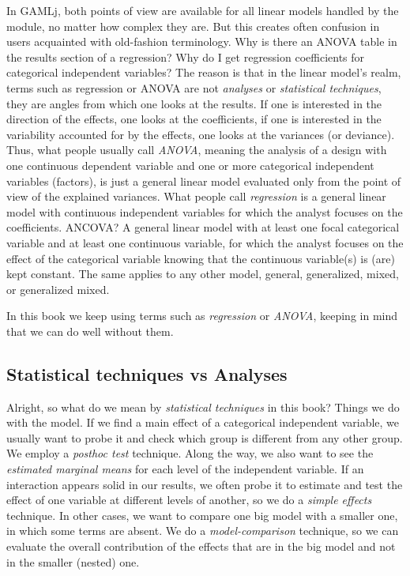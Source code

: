 \documentclass[
]{book}
\begin{document}
In {GAMLj}, both points of view are available for all linear models handled by the module, no matter how complex they are. But this creates often confusion in users acquainted with old-fashion terminology. Why is there an ANOVA table in the results section of a regression? Why do I get regression coefficients for categorical independent variables? The reason is that in the linear model's realm, terms such as regression or ANOVA are not \emph{analyses} or \emph{statistical techniques}, they are angles from which one looks at the results. If one is interested in the direction of the effects, one looks at the coefficients, if one is interested in the variability accounted for by the effects, one looks at the variances (or deviance). Thus, what people usually call \emph{ANOVA}, meaning the analysis of a design with one continuous dependent variable and one or more categorical independent variables (factors), is just a general linear model evaluated only from the point of view of the explained variances. What people call \emph{regression} is a general linear model with continuous independent variables for which the analyst focuses on the coefficients. ANCOVA? A general linear model with at least one focal categorical variable and at least one continuous variable, for which the analyst focuses on the effect of the categorical variable knowing that the continuous variable(s) is (are) kept constant. The same applies to any other model, general, generalized, mixed, or generalized mixed.

In this book we keep using terms such as \emph{regression} or \emph{ANOVA}, keeping in mind that we can do well without them.

\hypertarget{statistical-techniques-vs-analyses}{%
\subsection{Statistical techniques vs Analyses}\label{statistical-techniques-vs-analyses}}

Alright, so what do we mean by \emph{statistical techniques} in this book? Things we do with the model. If we find a main effect of a categorical independent variable, we usually want to probe it and check which group is different from any other group. We employ a \emph{posthoc test} technique. Along the way, we also want to see the \emph{estimated marginal means} for each level of the independent variable. If an interaction appears solid in our results, we often probe it to estimate and test the effect of one variable at different levels of another, so we do a \emph{simple effects} technique. In other cases, we want to compare one big model with a smaller one, in which some terms are absent. We do a \emph{model-comparison} technique, so we can evaluate the overall contribution of the effects that are in the big model and not in the smaller (nested) one.
\end{document}
